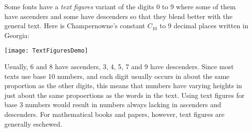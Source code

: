 \documentclass[12pt]{article}
\begin{document}
Some fonts have a {\em text figures} variant of the digits 0 to 9 where some of them have ascenders and some have descenders so that they blend better with the general text. Here is Champernowne's constant $C_{10}$ to 9 decimal places written in Georgia:

\begin{center}
\texttt{[image: TextFiguresDemo]}
\end{center}

Usually, 6 and 8 have ascenders, 3, 4, 5, 7 and 9 have descenders. Since most texts use base 10 numbers, and each digit usually occurs in about the same proportion as the other digits, this means that numbers have varying heights in just about the same propoertions as the  words in the text. Using text figures for base 3 numbers would result in numbers always lacking in ascenders and descenders. For mathematical books and papers, however, text figures are generally eschewed.
\end{document}
